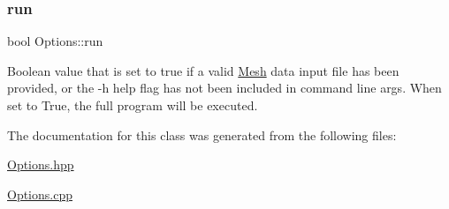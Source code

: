 \subsubsection{\texorpdfstring{run}{run}}
{\footnotesize\ttfamily bool Options\+::run}



Boolean value that is set to true if a valid \mbox{\hyperlink{class_mesh}{Mesh}} data input file has been provided, or the -\/h help flag has not been included in command line args. When set to True, the full program will be executed. 



The documentation for this class was generated from the following files\+:\begin{DoxyCompactItemize}
\item 
\mbox{\hyperlink{_options_8hpp}{Options.\+hpp}}\item 
\mbox{\hyperlink{_options_8cpp}{Options.\+cpp}}\end{DoxyCompactItemize}
